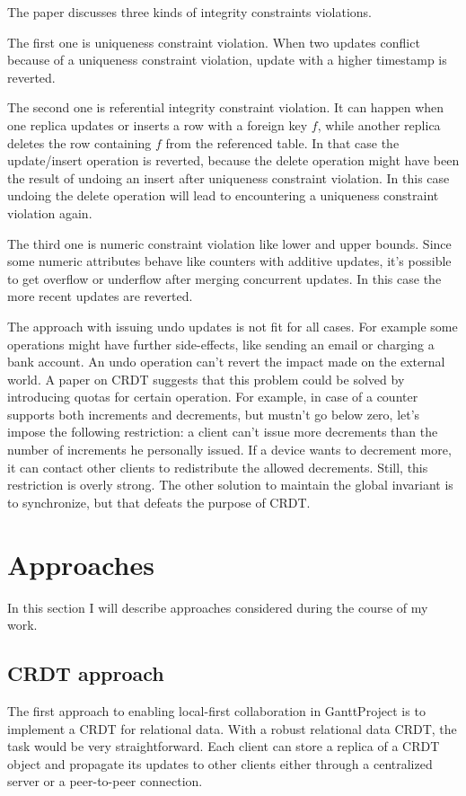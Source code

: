 \documentclass[a4paper, 11pt, oneside]{article}
\theoremstyle{definition}
\begin{document}
The paper discusses three kinds of integrity constraints violations. 

The first one is uniqueness constraint violation. When two updates conflict because of a uniqueness constraint violation, update with a higher timestamp is reverted. 

The second one is referential integrity constraint violation. It can happen when one replica updates or inserts a row with a foreign key $f$, while another replica deletes the row containing $f$ from the referenced table. In that case the update/insert operation is reverted, because the delete operation might have been the result of undoing an insert after uniqueness constraint violation. In this case undoing the delete operation will lead to encountering a uniqueness constraint violation again.

The third one is numeric constraint violation like lower and upper bounds. Since some numeric attributes behave like counters with additive updates, it's possible to get overflow or underflow after merging concurrent updates. In this case the more recent updates are reverted.

The approach with issuing undo updates is not fit for all cases. For example some operations might have further side-effects, like sending an email or charging a bank account.  An undo operation can't revert the impact made on the external world. A paper on CRDT \cite{crdt} suggests that this problem could be solved by introducing quotas for certain operation. For example, in case of a counter supports both increments and decrements, but mustn't go below zero, let's impose the following restriction: a client can't issue more decrements than the number of increments he personally issued. If a device wants to decrement more, it can contact other clients to redistribute the allowed decrements. Still, this restriction is overly strong. The other solution to maintain the global invariant is to synchronize, but that defeats the purpose of CRDT.

\section{Approaches}
In this section I will describe approaches considered during the course of my work.

\subsection{CRDT approach}
The first approach to enabling local-first collaboration in GanttProject is to implement a CRDT for relational data. With a robust relational data CRDT, the task would be very straightforward. Each client can store a replica of a CRDT object and propagate its updates to other clients either through a centralized server or a peer-to-peer connection.
\end{document}
